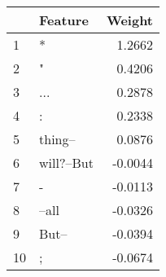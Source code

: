 \begin{tabular}{llr}
\toprule
{} &     Feature &  Weight \\
\midrule
1  &           * &  1.2662 \\
2  &           " &  0.4206 \\
3  &         ... &  0.2878 \\
4  &           : &  0.2338 \\
5  &     thing-- &  0.0876 \\
6  &  will?--But & -0.0044 \\
7  &           - & -0.0113 \\
8  &       --all & -0.0326 \\
9  &       But-- & -0.0394 \\
10 &           ; & -0.0674 \\
\bottomrule
\end{tabular}
